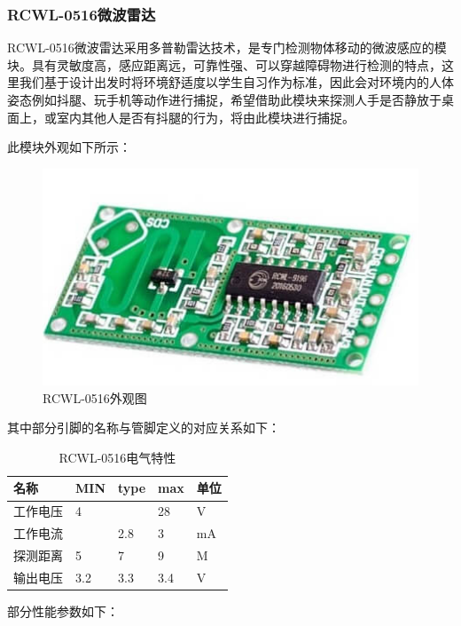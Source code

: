 \documentclass[a4paper, 11pt]{article} %
\begin{document}
\subsubsection{RCWL-0516微波雷达}
\par{} RCWL-0516微波雷达采用多普勒雷达技术，是专门检测物体移动的微波感应的模块。具有灵敏度高，感应距离远，可靠性强、可以穿越障碍物进行检测的特点，这里我们基于设计出发时将环境舒适度以学生自习作为标准，因此会对环境内的人体姿态例如抖腿、玩手机等动作进行捕捉，希望借助此模块来探测人手是否静放于桌面上，或室内其他人是否有抖腿的行为，将由此模块进行捕捉。
\par{} 此模块外观如下所示：
\begin{figure}[H]
  \centering
  \includegraphics[scale = 0.6 ]{1-10.png}
  \caption{RCWL-0516外观图}
  \label{img10} 
\end{figure}
\par{} 其中部分引脚的名称与管脚定义的对应关系如下：
\begin{table}[H]
  \centering
  \label{tab5}
  \begin{threeparttable}
    \small
    \begin{tabular} {p{70pt}p{70pt}p{70pt}p{70pt}p{70pt}}
      \hline
      名称&MIN&type&max&单位\\
      \hline
      工作电压&4&&28&V\\
      工作电流&&2.8&3&mA\\
      探测距离&5&7&9&M\\
      输出电压&3.2&3.3&3.4&V\\
      \hline
    \end{tabular}
    \small
  \end{threeparttable}
  \caption{RCWL-0516电气特性}
\end{table}
\par{}部分性能参数如下：
\end{document}
